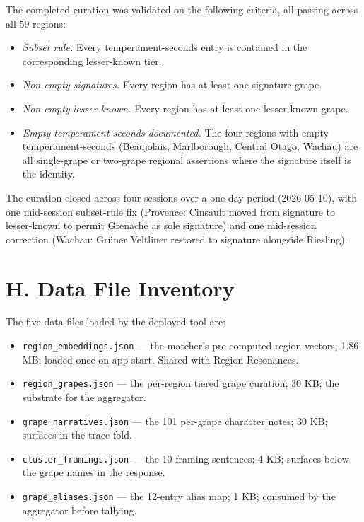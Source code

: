 \documentclass[11pt]{article}
\begin{document}
The completed curation was validated on the following criteria, all passing across all 59 regions:

\begin{itemize}[leftmargin=2em,itemsep=0.1em]
\item \emph{Subset rule.} Every temperament-seconds entry is contained in the corresponding lesser-known tier.
\item \emph{Non-empty signatures.} Every region has at least one signature grape.
\item \emph{Non-empty lesser-known.} Every region has at least one lesser-known grape.
\item \emph{Empty temperament-seconds documented.} The four regions with empty temperament-seconds (Beaujolais, Marlborough, Central Otago, Wachau) are all single-grape or two-grape regional assertions where the signature itself is the identity.
\end{itemize}

The curation closed across four sessions over a one-day period (2026-05-10), with one mid-session subset-rule fix (Provence: Cinsault moved from signature to lesser-known to permit Grenache as sole signature) and one mid-session correction (Wachau: Gr\"uner Veltliner restored to signature alongside Riesling).

\section*{H. Data File Inventory}

The five data files loaded by the deployed tool are:

\begin{itemize}[leftmargin=2em,itemsep=0.1em]
\item \texttt{region\_embeddings.json} --- the matcher's pre-computed region vectors; 1.86 MB; loaded once on app start. Shared with Region Resonances.
\item \texttt{region\_grapes.json} --- the per-region tiered grape curation; 30 KB; the substrate for the aggregator.
\item \texttt{grape\_narratives.json} --- the 101 per-grape character notes; 30 KB; surfaces in the trace fold.
\item \texttt{cluster\_framings.json} --- the 10 framing sentences; 4 KB; surfaces below the grape names in the response.
\item \texttt{grape\_aliases.json} --- the 12-entry alias map; 1 KB; consumed by the aggregator before tallying.
\end{itemize}
\end{document}
